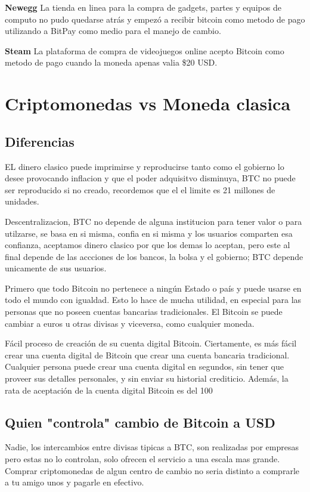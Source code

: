 \documentclass[12pt,letterpaper]{article}
\begin{document}
\textbf{Newegg}
La tienda en linea para la compra de gadgets, partes y equipos de computo no pudo quedarse atr\'as y empez\'o a recibir bitcoin como metodo de pago utilizando a BitPay como medio para el manejo de cambio.

\textbf{Steam}
La plataforma de compra de videojuegos online acepto Bitcoin como metodo de pago cuando la moneda apenas valia \$20 USD.
\section*{Criptomonedas vs Moneda clasica}

	\subsection*{Diferencias}
	EL dinero clasico puede imprimirse y reproducirse tanto como el gobierno lo desee provocando inflacion y que el poder adquisitvo disminuya, BTC no puede ser reproducido si no creado, recordemos que el el limite es 21 millones de unidades.
	
	Descentralizacion, BTC no depende de alguna institucion para tener valor o para utilzarse, se basa en si misma, confia en si misma y los usuarios comparten esa confianza, aceptamos dinero clasico por que los demas lo aceptan, pero este al final depende de las accciones de los bancos, la bolsa y el gobierno; BTC depende unicamente de sus usuarios.
	
	Primero que todo Bitcoin no pertenece a ning\'un Estado o pa\'is y puede usarse en todo el mundo con igualdad. Esto lo hace de mucha utilidad, en especial para las personas que no poseen cuentas bancarias tradicionales. El Bitcoin se puede cambiar a euros u otras divisas y viceversa, como cualquier moneda. 
	
	F\'acil proceso de creaci\'on de su cuenta digital Bitcoin. Ciertamente, es m\'as f\'acil crear una cuenta digital de Bitcoin que crear una cuenta bancaria tradicional. Cualquier persona puede crear una cuenta digital en segundos, sin tener que proveer sus detalles personales, y sin enviar su historial crediticio. Adem\'as, la rata de aceptaci\'on de la cuenta digital Bitcoin es del 100%
	
	\subsection*{Quien "controla" cambio de Bitcoin a USD}
	Nadie, los intercambios entre divisas tipicas a BTC, son realizadas por empresas pero estas no lo controlan, solo ofrecen el servicio a una escala mas grande. Comprar criptomonedas de algun centro de cambio no seria distinto a comprarle a tu amigo unos y pagarle en efectivo.
\end{document}
